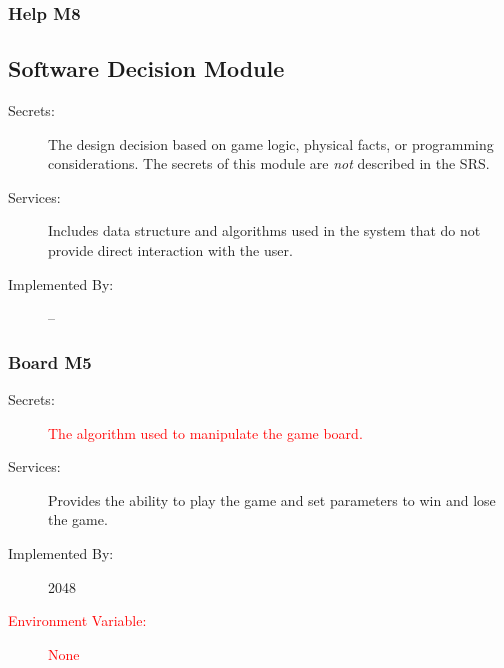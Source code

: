 \documentclass[12pt]{article}
\begin{document}
{}

{\color{red}\subsubsection{Help \textbf{M8}}}

{}

\subsection{Software Decision Module}

\begin{description}
\item[Secrets:] The design decision based on game logic, physical
  facts, or programming considerations. The secrets of this module are
  \emph{not} described in the SRS.
\item[Services:] Includes data structure and algorithms used in the system that
  do not provide direct interaction with the user. 
\item[Implemented By:] --
\end{description}

\subsubsection{Board \textbf{M5}}

\begin{description}
\item[Secrets:] \textcolor{red}{The algorithm used to manipulate the game board.}
\item[Services:] Provides the ability to play the game and set parameters to win and lose the game. 
\item[Implemented By:] 2048
\item[\textcolor{red}{Environment Variable:} ]\textcolor{red}{None} 
\end{description}
\end{document}
